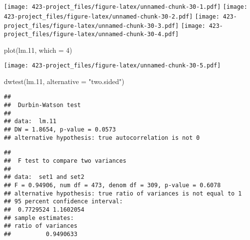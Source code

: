 \documentclass[
]{article}
\newenvironment{Shaded}{\begin{snugshade}}{\end{snugshade}}
\newcommand{\AttributeTok}[1]{\textcolor[rgb]{0.77,0.63,0.00}{#1}}
\newcommand{\DecValTok}[1]{\textcolor[rgb]{0.00,0.00,0.81}{#1}}
\newcommand{\FloatTok}[1]{\textcolor[rgb]{0.00,0.00,0.81}{#1}}
\newcommand{\FunctionTok}[1]{\textcolor[rgb]{0.00,0.00,0.00}{#1}}
\newcommand{\NormalTok}[1]{#1}
\newcommand{\OtherTok}[1]{\textcolor[rgb]{0.56,0.35,0.01}{#1}}
\newcommand{\SpecialCharTok}[1]{\textcolor[rgb]{0.00,0.00,0.00}{#1}}
\newcommand{\StringTok}[1]{\textcolor[rgb]{0.31,0.60,0.02}{#1}}
\begin{document}
\texttt{[image: 423-project\_files/figure-latex/unnamed-chunk-30-1.pdf]}
\texttt{[image: 423-project\_files/figure-latex/unnamed-chunk-30-2.pdf]}
\texttt{[image: 423-project\_files/figure-latex/unnamed-chunk-30-3.pdf]}
\texttt{[image: 423-project\_files/figure-latex/unnamed-chunk-30-4.pdf]}

\begin{Shaded}
\begin{Highlighting}[]
\FunctionTok{plot}\NormalTok{(lm}\FloatTok{.11}\NormalTok{, }\AttributeTok{which =} \DecValTok{4}\NormalTok{)}
\end{Highlighting}
\end{Shaded}

\texttt{[image: 423-project\_files/figure-latex/unnamed-chunk-30-5.pdf]}

\begin{Shaded}
\begin{Highlighting}[]
\FunctionTok{dwtest}\NormalTok{(lm}\FloatTok{.11}\NormalTok{, }\AttributeTok{alternative =} \StringTok{"two.sided"}\NormalTok{)}
\end{Highlighting}
\end{Shaded}

\begin{verbatim}
## 
##  Durbin-Watson test
## 
## data:  lm.11
## DW = 1.8654, p-value = 0.0573
## alternative hypothesis: true autocorrelation is not 0
\end{verbatim}

\begin{Shaded}
\end{Shaded}

\begin{verbatim}
## 
##  F test to compare two variances
## 
## data:  set1 and set2
## F = 0.94906, num df = 473, denom df = 309, p-value = 0.6078
## alternative hypothesis: true ratio of variances is not equal to 1
## 95 percent confidence interval:
##  0.7729524 1.1602054
## sample estimates:
## ratio of variances 
##          0.9490633
\end{verbatim}
\end{document}

